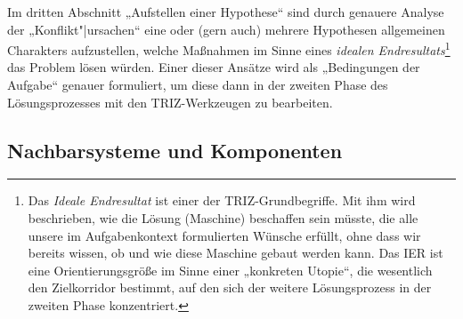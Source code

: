 \documentclass[11pt,a4paper]{article}
\begin{document}
Im dritten Abschnitt „Aufstellen einer Hypothese“ sind durch genauere Analyse
der „Konflikt"|ursachen“ eine oder (gern auch) mehrere Hypothesen allgemeinen
Charakters aufzustellen, welche Maßnahmen im Sinne eines \emph{idealen
  Endresultats}\footnote{Das \emph{Ideale Endresultat} ist einer der
  TRIZ-Grundbegriffe. Mit ihm wird beschrieben, wie die Lösung (Maschine)
  beschaffen sein müsste, die alle unsere im Aufgabenkontext formulierten
  Wünsche erfüllt, ohne dass wir bereits wissen, ob und wie diese Maschine
  gebaut werden kann.  Das IER ist eine Orientierungsgröße im Sinne einer
  „konkreten Utopie“, die wesentlich den Zielkorridor bestimmt, auf den sich
  der weitere Lösungsprozess in der zweiten Phase konzentriert.} das Problem
lösen würden.  Einer dieser Ansätze wird als „Bedingungen der Aufgabe“ genauer
formuliert, um diese dann in der zweiten Phase des Lösungsprozesses mit den
TRIZ-Werkzeugen zu bearbeiten.

\subsection*{Nachbarsysteme und Komponenten}
\end{document}
